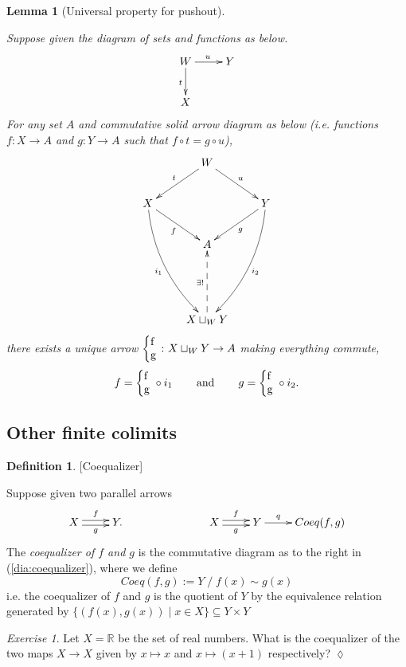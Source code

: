 \documentclass{book}
\def\RR{{\mathbb R}}
\def\hsp{\hspace{.3in}}
\def\to{\rightarrow}
\def\taking{\colon}
\def\ss{\subseteq}
\def\|{{\;|\;}}
\newcommand{\coprodmap}[2]{{\left\{\parbox{.1in}{#1\\#2}\right.}}
\newcommand{\po}[3]{\coprodmap{#1}{#2}}
\newtheorem{lemma}[subsubsection]{Lemma}
\theoremstyle{remark}
\newtheorem{exc}[subsubsection]{Exercise}
\newenvironment{exercise}{\begin{exc}}{\hspace*{\fill}$\lozenge$\end{exc}}
\theoremstyle{definition}
\newtheorem{definition}[subsubsection]{Definition}
\begin{document}
\begin{lemma}[Universal property for pushout]\label{lemma:up for po}

Suppose given the diagram of sets and functions as below.
\begin{align*}
\xymatrix{W\ar[r]^u\ar[d]_t&Y\\
X}
\end{align*}
For any set $A$ and commutative solid arrow diagram as below (i.e. functions $f\taking X\to A$ and $g\taking Y\to A$ such that $f\circ t=g\circ u$), 
\begin{align}\label{dia:universal property of po}
\xymatrix{
&W\ar[dr]^u\ar[dl]_t\\
X\ar@/_1pc/[dddr]_{i_1}\ar[rd]_f&&Y\ar@/^1pc/[dddl]^{i_2}\ar[dl]^g\\
&A\\\\
&X\sqcup_WY\ar@{-->}[uu]^{\exists!}
}
\end{align}
there exists a unique arrow $\po{f}{g}{W}\taking X\sqcup_WY\to A$ making everything commute, $$f=\po{f}{g}{W}\circ i_1\hsp\text{and}\hsp g=\po{f}{g}{W}\circ i_2.$$

\end{lemma}


\subsection{Other finite colimits}

\begin{definition}\label{def:coequalizer}[Coequalizer]

Suppose given two parallel arrows 
\begin{align}\label{dia:coequalizer}
\xymatrix{X\ar@<.5ex>[r]^f\ar@<-.5ex>[r]_g&Y.}\hspace{1in}\xymatrix{X\ar@<.5ex>[r]^f\ar@<-.5ex>[r]_g&Y\ar[r]^-q&Coeq(f,g)}
\end{align}
The {\em coequalizer of $f$ and $g$} is the commutative diagram as to the right in (\ref{dia:coequalizer}), where we define $$Coeq(f,g):=Y\;/\;f(x)\sim g(x)$$ i.e. the coequalizer of $f$ and $g$ is the quotient of $Y$ by the equivalence relation generated by $\{(f(x),g(x))\|x\in X\}\ss Y\times Y$

\end{definition}

\begin{exercise}
Let $X=\RR$ be the set of real numbers. What is the coequalizer of the two maps $X\to X$ given by $x\mapsto x$ and $x\mapsto (x+1)$ respectively?
\end{exercise}
\end{document}
